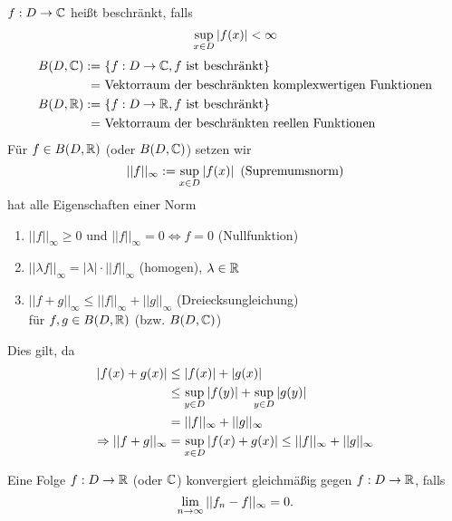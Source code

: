 \documentclass[../ana1.tex]{subfiles}
\begin{document}
\begin{defi}
    \( f: D \rightarrow \mathbb{C} \) heißt beschränkt, falls 
    \[ \underset{x\in D}{\sup} \left|f(x)\right| < \infty \]
    \begin{align*}
        B(D, \mathbb{C}) :=\ &\{ f: D \rightarrow \mathbb{C}, 
        f \text{ ist beschränkt} \} \\
        =\ &\text{Vektorraum der beschränkten 
        komplexwertigen Funktionen} \\
        B(D, \mathbb{R}) :=\ &\{ f: D \rightarrow \mathbb{R}, 
        f \text{ ist beschränkt} \} \\
        =\ &\text{Vektorraum der beschränkten reellen Funktionen}
    \end{align*}
    Für \( f\in B(D,\mathbb{R}) \) (oder \( B(D,\mathbb{C}) \)) setzen wir 
    \[ ||f||_\infty := \underset{x\in D}{\sup} \left|f(x)\right| 
    \text{ (Supremumsnorm)} \]
    hat alle Eigenschaften einer Norm
    \begin{enumerate}
        \item \( ||f||_\infty \geq 0 \) und 
        \( ||f||_\infty = 0 \Leftrightarrow f = 0 \) 
        (Nullfunktion)
        \item \( ||\lambda f||_\infty = |\lambda| \cdot 
        ||f||_\infty \) (homogen), \( \lambda \in \mathbb{R} \)
        \item \( ||f+g||_\infty \leq ||f||_\infty 
        + ||g||_\infty \) (Dreiecksungleichung) \\
        für \( f, g \in B(D, \mathbb{R}) \) (bzw. \( B(D,\mathbb{C}) \))
    \end{enumerate}
    Dies gilt, da
    \begin{align*}
        \left| f(x) + g(x) \right| &\leq \left|f(x)\right| + \left|g(x)\right| \\
        &\leq \underset{y\in D}{\sup} \left| f(y) \right| 
        + \underset{y\in D}{\sup} \left|g(y)\right|\\
        &= ||f||_\infty + ||g||_\infty \\
        \Rightarrow ||f + g||_\infty &= \underset{x\in D}{\sup}
        \left|f(x) + g(x)\right| \leq ||f||_\infty + ||g||_\infty
    \end{align*}
\end{defi}
\begin{defi}
    Eine Folge \( f: D \rightarrow \mathbb{R} \) (oder \( \mathbb{C} \)) 
    konvergiert gleichmäßig gegen \( f: D \rightarrow \mathbb{R} \), 
    falls 
    \[ \lim\limits_{n\rightarrow\infty} ||f_n - f ||_\infty = 0. \]
\end{defi}
\end{document}
